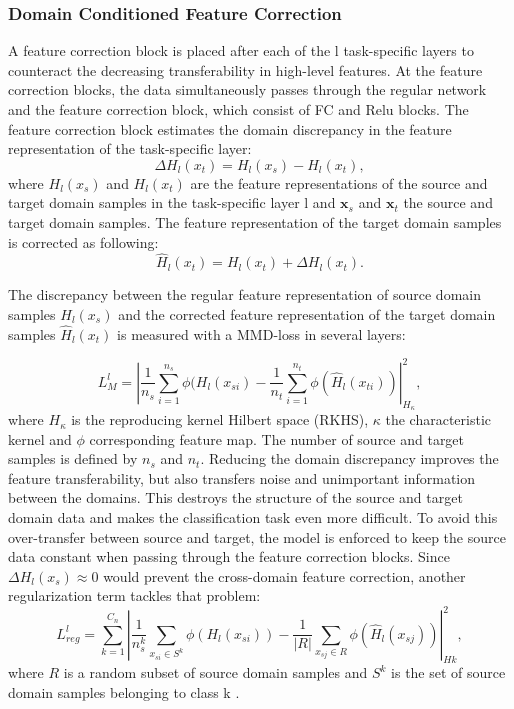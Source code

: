 \subsubsection{Domain Conditioned Feature Correction}
A feature correction block is placed after each of the l task-specific layers to counteract the decreasing transferability in high-level features. At the feature correction blocks, the data simultaneously passes through the regular network and the feature correction block, which consist of FC and Relu blocks. The feature correction block estimates the domain discrepancy in the feature representation of the task-specific layer:
\begin{equation}
    \Delta H_{l}(x_{t}) = H_{l}(x_{s}) - H_{l}(x_{t}),
\end{equation}
where $H_{l}(x_{s})$ and $H_{l}(x_{t})$ are the feature representations of the source and target domain samples in the task-specific layer l and $\pmb{x}_{s}$ and $\pmb{x}_{t}$ the source and target domain samples. The feature representation of the target domain samples is corrected as following:
\begin{equation}
    \hat{H}_{l}(x_{t}) = H_{l}(x_{t}) + \Delta H_{l}(x_{t}).
\end{equation}


The discrepancy between the regular feature representation of source domain samples $H_{l}(x_{s})$ and the corrected feature representation of the target domain samples $\hat{H}_{l}(x_{t})$ is measured with a MMD-loss in several layers:

\begin{equation}
    L_{M}^{l} = |\frac{1}{n_s} \sum_{i=1}^{n_{s}} \phi(H_{l}(x_{si}) - \frac{1}{n_t} \sum_{i=1}^{n_{t}} \phi(\hat{H}_{l}(x_{ti}))|_{H_{\kappa}}^{2}, 
\end{equation}
where $H_{\kappa}$ is the reproducing kernel Hilbert space (RKHS), $\kappa$ the characteristic kernel and $\phi$ corresponding feature map. The number of source and target samples is defined by $n_{s}$ and $n_{t}$. Reducing the domain discrepancy improves the feature transferability, but also transfers noise and unimportant information between the domains. This destroys the structure of the source and target domain data and makes the classification task even more difficult. To avoid this over-transfer between source and target, the model is enforced to keep the source data constant when passing through the feature correction blocks. Since $\Delta H_{l}(x_{s}) \approx 0$ would prevent the cross-domain feature correction, another regularization term tackles that problem:
\begin{equation}
    L_{reg}^{l} = \sum_{k=1}^{C_{n}}|\frac{1}{n_{s}^{k}} \sum_{x_{si} \in S^{k}} \phi(H_{l}(x_{si})) - \frac{1}{|R|} \sum_{x_{sj} \in R} \phi(\hat{H}_{l}(x_{sj}))|_{Hk}^{2}, 
\end{equation}
where $R$ is a random subset of source domain samples and $S^{k}$ is the set of source domain samples belonging to class k \cite{li2020}.

